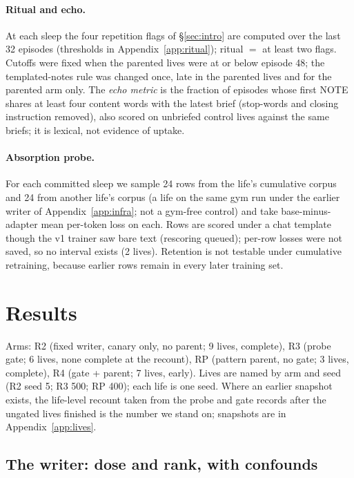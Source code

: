 \documentclass{article}
\begin{document}
\paragraph{Ritual and echo.} At each sleep the four repetition flags of \S\ref{sec:intro} are computed over the last 32 episodes (thresholds in Appendix~\ref{app:ritual}); ritual $=$ at least two flags. Cutoffs were fixed when the parented lives were at or below episode 48; the templated-notes rule was changed once, late in the parented lives and for the parented arm only. The \emph{echo metric} is the fraction of episodes whose first NOTE shares at least four content words with the latest brief (stop-words and closing instruction removed), also scored on unbriefed control lives against the same briefs; it is lexical, not evidence of uptake.

\paragraph{Absorption probe.} For each committed sleep we sample 24 rows from the life's cumulative corpus and 24 from another life's corpus (a life on the same gym run under the earlier writer of Appendix~\ref{app:infra}; not a gym-free control) and take base-minus-adapter mean per-token loss on each. Rows are scored under a chat template though the v1 trainer saw bare text (rescoring queued); per-row losses were not saved, so no interval exists (2 lives). Retention is not testable under cumulative retraining, because earlier rows remain in every later training set.

\section{Results}
\label{sec:results}

Arms: R2 (fixed writer, canary only, no parent; 9 lives, complete), R3 (probe gate; 6 lives, none complete at the recount), RP (pattern parent, no gate; 3 lives, complete), R4 (gate + parent; 7 lives, early). Lives are named by arm and seed (R2 seed 5; R3 500; RP 400); each life is one seed. Where an earlier snapshot exists, the life-level recount taken from the probe and gate records after the ungated lives finished is the number we stand on; snapshots are in Appendix~\ref{app:lives}.

\subsection{The writer: dose and rank, with confounds}
\label{sec:writer}
\end{document}
